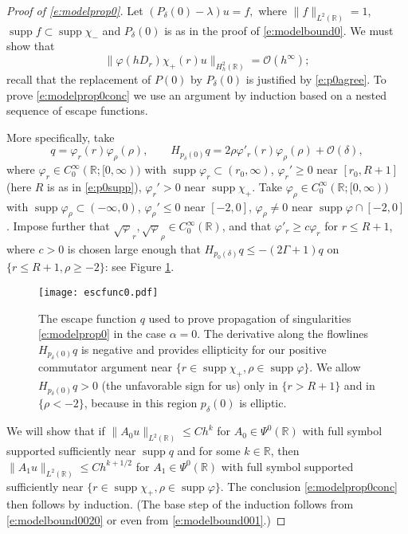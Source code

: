 \documentclass[reqno, 12pt]{amsart}
\newcommand \R {\mathbb{R}}
\newcommand \Oh {\mathcal{O}}
\DeclareMathOperator \supp {supp}
\theoremstyle{definition}
\numberwithin{equation}{section}
\numberwithin{prop}{section}
\numberwithin{figure}{section}
\begin{document}
\begin{proof}[Proof of \eqref{e:modelprop0}]
Let $(P_\delta(0) - \lambda)u = f,$
where $\|f\|_{L^2(\R)} =1$,  $\supp f \subset \supp \chi_-$ and $P_\delta(0)$ is as in the proof of \eqref{e:modelbound0}. We must show that 
\begin{equation}\label{e:modelprop0conc}
\|\varphi(hD_r) \chi_+(r) u\|_{H^{2}_h(\R)} = \Oh(h^\infty);
\end{equation}
recall that the replacement of $P(0)$ by $P_\delta(0)$ is justified by \eqref{e:p0agree}. To prove \eqref{e:modelprop0conc} we use an argument by induction based on a nested sequence of escape functions.

More specifically, take
\[
q = \varphi_r(r)\varphi_\rho(\rho), \qquad 
H_{p_\delta(0)} q = 
2\rho\varphi'_r(r)\varphi_\rho(\rho) + \Oh(\delta),
\]
where $\varphi_r \in C_0^\infty(\R;[0,\infty))$ with $\supp \varphi_r \subset (r_0,\infty)$, $\varphi_r' \ge 0$ near $[r_0,R+1]$ (here $R$ is as in \eqref{e:p0supp}), $\varphi_r' > 0$ near $\supp \chi_+$. Take $\varphi_\rho \in C_0^\infty(\R;[0,\infty))$ with $\supp \varphi_\rho \subset (-\infty,0)$, $\varphi_\rho' \le 0$ near $[-2,0]$, $\varphi_\rho \ne 0$ near $\supp \varphi \cap [-2,0]$.  Impose further that $\sqrt\varphi_r, \sqrt\varphi_\rho \in C_0^\infty(\R)$, and that $\varphi'_r \ge c \varphi_r$ for $r \le R+1$, where $c >0$ is chosen large enough that $H_{p_0(\delta)} q \le -(2\Gamma +1)q$ on $\{r \le R+1, \rho \ge -2\}$: see Figure \ref{f:p0prop}.

\begin{figure}[htbp]
\texttt{[image: escfunc0.pdf]}
\caption{The escape function $q$ used to prove propagation of singularities \eqref{e:modelprop0} in the case $\alpha = 0$. The derivative along the flowlines $H_{p_\delta(0)}q$ is negative and provides ellipticity for our positive commutator argument near $\{r \in \supp \chi_+, \rho \in \supp \varphi\}$. We allow $H_{p_\delta(0)}q > 0$ (the unfavorable sign for us) only in $\{r > R+1\}$ and in $\{\rho < -2\}$, because in this region $p_\delta(0)$ is elliptic.}
\label{f:p0prop}
\end{figure}

We will show that if $\|A_0u\|_{L^2(\R)} \le C h^k$ for $A_0 \in \Psi^0(\R)$ with full symbol supported sufficiently near $\supp q$ and for some $k \in \R$, then $\|A_1 u\|_{L^2(\R)} \le C h^{k + 1/2}$ for $A_1 \in \Psi^0(\R)$ with full symbol supported sufficiently near $\{ r \in \supp \chi_+, \rho \in \supp \varphi\}$. The conclusion \eqref{e:modelprop0conc} then follows by induction. (The base step of the induction follows from \eqref{e:modelbound0020} or even from \eqref{e:modelbound001}.)


\end{proof}
\end{document}
